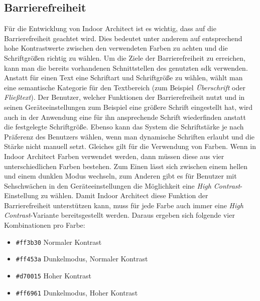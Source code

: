 \subsection{Barrierefreiheit}
Für die Entwicklung von Indoor Architect ist es wichtig, dass auf die Barrierefreiheit geachtet wird.
Dies bedeutet unter anderem auf entsprechend hohe Kontrastwerte zwischen den verwendeten Farben zu achten und die Schriftgrößen richtig zu wählen.
Um die Ziele der Barrierefreiheit zu erreichen, kann man die bereits vorhandenen Schnittstellen des genutzten \Gls{sdk} verwenden.\pbreak%
%
Anstatt für einen Text eine Schriftart und Schriftgröße zu wählen, wählt man eine semantische Kategorie für den Textbereich (zum Beispiel \emph{Überschrift} oder \emph{Fließtext}).
Der Benutzer, welcher Funktionen der Barrierefreiheit nutzt und in seinen Geräteeinstellungen zum Beispiel eine größere Schrift eingestellt hat, wird auch in der Anwendung eine für ihn ansprechende Schrift wiederfinden anstatt die festgelegte Schriftgröße.
Ebenso kann das System die Schriftstärke je nach Präferenz des Benutzers wählen, wenn man dynamische Schriften erlaubt und die Stärke nicht manuell setzt.\pbreak%
%
Gleiches gilt für die Verwendung von Farben.
Wenn in Indoor Architect Farben verwendet werden, dann müssen diese aus vier unterschiedlichen Farben bestehen.
Zum Einen lässt sich zwischen einem hellen und einem dunklen Modus wechseln, zum Anderen gibt es für Benutzer mit Sehschwächen in den Geräteeinstellungen die Möglichkeit eine \emph{High Contrast}-Einstellung zu wählen.
Damit Indoor Architect diese Funktion der Barrierefreiheit unterstützen kann, muss für jede Farbe auch immer eine \emph{High Contrast}-Variante bereitsgestellt werden.
Daraus ergeben sich folgende vier Kombinationen pro Farbe:
\begin{itemize}
	\setlength\itemsep{0pt}
	\item[] \colorbox{redL}{\color{white}\texttt{\#ff3b30}\hspace{20pt}} \hspace{10pt}Normaler Kontrast
	\item[] \colorbox{redDL}{\color{white}\texttt{\#ff453a}\hspace{20pt}} \hspace{10pt}Dunkelmodus, Normaler Kontrast
	\item[] \colorbox{redH}{\color{white}\texttt{\#d70015}\hspace{20pt}} \hspace{10pt}Hoher Kontrast
	\item[] \colorbox{redDH}{\color{white}\texttt{\#ff6961}\hspace{20pt}} \hspace{10pt}Dunkelmodus, Hoher Kontrast
\end{itemize}
